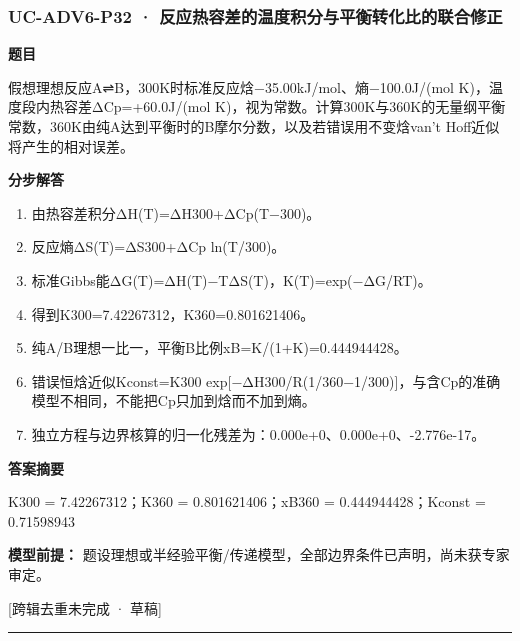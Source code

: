 \documentclass[UTF8,11pt,a4paper]{ctexart}
\begin{document}
\subsubsection*{UC-ADV6-P32 · 反应热容差的温度积分与平衡转化比的联合修正}
\noindent\textbf{题目}\par
假想理想反应A⇌B，300K时标准反应焓−35.00kJ/mol、熵−100.0J/(mol K)，温度段内热容差ΔCp=+60.0J/(mol K)，视为常数。计算300K与360K的无量纲平衡常数，360K由纯A达到平衡时的B摩尔分数，以及若错误用不变焓van't Hoff近似将产生的相对误差。\par
\medskip\noindent\textbf{分步解答}
\begin{enumerate}
\item 由热容差积分ΔH(T)=ΔH300+ΔCp(T−300)。
\item 反应熵ΔS(T)=ΔS300+ΔCp ln(T/300)。
\item 标准Gibbs能ΔG(T)=ΔH(T)−TΔS(T)，K(T)=exp(−ΔG/RT)。
\item 得到K300=7.42267312，K360=0.801621406。
\item 纯A/B理想一比一，平衡B比例xB=K/(1+K)=0.444944428。
\item 错误恒焓近似Kconst=K300 exp[−ΔH300/R(1/360−1/300)]，与含Cp的准确模型不相同，不能把Cp只加到焓而不加到熵。
\item 独立方程与边界核算的归一化残差为：0.000e+0、0.000e+0、-2.776e-17。
\end{enumerate}
\noindent\textbf{答案摘要}\par
K300 = 7.42267312；K360 = 0.801621406；xB360 = 0.444944428；Kconst = 0.71598943\par
\noindent\textbf{模型前提：}
题设理想或半经验平衡/传递模型，全部边界条件已声明，尚未获专家审定。\par
\noindent\textcolor{red!65!black}{[跨辑去重未完成 · 草稿]} \par
\medskip\hrule\medskip
{}
\end{document}
